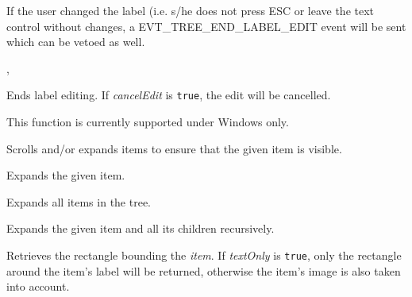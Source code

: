 If the user changed the label (i.e. s/he does not press ESC or leave
the text control without changes, a EVT\_TREE\_END\_LABEL\_EDIT event
will be sent which can be vetoed as well.


,


\label{wxtreectrlendeditlabel}


Ends label editing. If {\it cancelEdit} is {\tt true}, the edit will be cancelled.

This function is currently supported under Windows only.




\label{wxtreectrlensurevisible}


Scrolls and/or expands items to ensure that the given item is visible.


\label{wxtreectrlexpand}


Expands the given item.


\label{wxtreectrlexpandall}


Expands all items in the tree.


\label{wxtreectrlexpandallchildren}


Expands the given item and all its children recursively.


\label{wxtreectrlgetitemrect}


Retrieves the rectangle bounding the {\it item}. If {\it textOnly} is {\tt true},
only the rectangle around the item's label will be returned, otherwise the
item's image is also taken into account.

